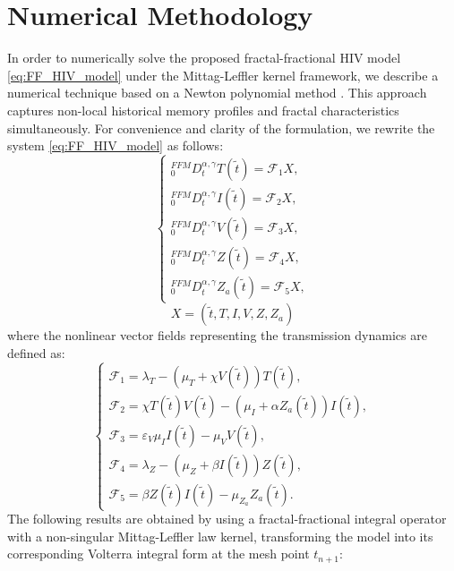 \documentclass{article}
\theoremstyle{plain}
\theoremstyle{definition}
\numberwithin{equation}{section}
\begin{document}
\section{Numerical Methodology}\label{sec7}
In order to numerically solve the proposed fractal-fractional HIV model \eqref{eq:FF_HIV_model} under the Mittag-Leffler kernel framework, we describe a numerical technique based on a Newton polynomial method \cite{7}. This approach captures non-local historical memory profiles and fractal characteristics simultaneously. For convenience and clarity of the formulation, we rewrite the system \eqref{eq:FF_HIV_model} as follows:
\begin{equation}
\label{eq:functional_form}
\begin{cases}
{}^{FFM}_{0}D_{t}^{\alpha,\gamma} T(\tilde{t}) = \mathcal{F}_1X, \\[6pt]
{}^{FFM}_{0}D_{t}^{\alpha,\gamma} I(\tilde{t}) = \mathcal{F}_2X, \\[6pt]
{}^{FFM}_{0}D_{t}^{\alpha,\gamma} V(\tilde{t}) = \mathcal{F}_3X, \\[6pt]
{}^{FFM}_{0}D_{t}^{\alpha,\gamma} Z(\tilde{t}) = \mathcal{F}_4X, \\[6pt]
{}^{FFM}_{0}D_{t}^{\alpha,\gamma} Z_{a}(\tilde{t}) = \mathcal{F}_5X,
\end{cases}
\end{equation}
\begin{equation*}
X = (\tilde{t}, T, I, V, Z, Z_a)
\end{equation*}
where the nonlinear vector fields representing the transmission dynamics are defined as:
\begin{equation}
\begin{cases}
\mathcal{F}_1 = \lambda_T - (\mu_T + \chi V(\tilde{t}))T(\tilde{t}), \\[6pt]
\mathcal{F}_2 = \chi T(\tilde{t})V(\tilde{t}) - (\mu_I  + \alpha Z_{a}(\tilde{t}))I(\tilde{t}), \\[6pt]
\mathcal{F}_3 = \varepsilon_V \mu_I I(\tilde{t}) - \mu_V V(\tilde{t}), \\[6pt]
\mathcal{F}_4 = \lambda_Z - (\mu_Z  + \beta  I(\tilde{t}))Z(\tilde{t}), \\[6pt]
\mathcal{F}_5 = \beta Z(\tilde{t}) I(\tilde{t}) - \mu_{Z_a} Z_{a}(\tilde{t}).
\end{cases}
\end{equation}
The following results are obtained by using a fractal-fractional integral operator with a non-singular Mittag-Leffler law kernel, transforming the model into its corresponding Volterra integral form at the mesh point $t_{n+1}$:
\end{document}
